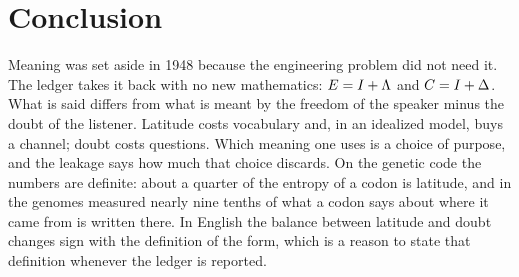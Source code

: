 \section{Conclusion}\label{sec:conclusion}
Meaning was set aside in 1948 because the engineering problem did not need it. The ledger takes it back with no new mathematics: $E=I+\Lambda$ and $C=I+\Delta$. What is said differs from what is meant by the freedom of the speaker minus the doubt of the listener. Latitude costs vocabulary and, in an idealized model, buys a channel; doubt costs questions. Which meaning one uses is a choice of purpose, and the leakage says how much that choice discards. On the genetic code the numbers are definite: about a quarter of the entropy of a codon is latitude, and in the genomes measured nearly nine tenths of what a codon says about where it came from is written there. In English the balance between latitude and doubt changes sign with the definition of the form, which is a reason to state that definition whenever the ledger is reported.
